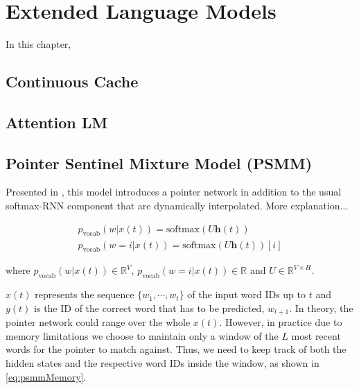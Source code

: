 \chapter{Extended Language Models}

In this chapter, 


\section{Continuous Cache}
\label{sec:continuousCache}

\cite{grave2016improving}

\section{Attention LM}
\label{sec:attention}

\cite{daniluk2017frustratingly}

\section{Pointer Sentinel Mixture Model (PSMM)}
\label{sec:pointerMixture}

Presented in \cite{merity2016pointer}, this model introduces a pointer network in addition to the usual softmax-RNN component that are dynamically interpolated. More explanation...

\begin{equation} \label{eq:psmmMemory}
	\begin{gathered}
		p_{\text{vocab}}(w|x(t)) = \text{softmax}(U\mathbf{h}(t))  \\
		p_{\text{vocab}}(w=i|x(t)) = \text{softmax}(U\mathbf{h}(t))[i] 
	\end{gathered}	
\end{equation}

where $p_{\text{vocab}}(w|x(t)) \in \mathbb{R}^{V}$, $p_{\text{vocab}}(w=i|x(t)) \in \mathbb{R}$ and $U \in \mathbb{R}^{V \times H}$.

$x(t)$ represents the sequence $\{w_1, \cdots , w_t\}$ of the input word IDs up to $t$  and $y(t)$ is the ID of the correct word that has to be predicted, $w_{t+1}$. In theory, the pointer network could range over the whole $x(t)$. However, in practice due to memory limitations we choose to maintain only a window of the $L$ most recent words for the pointer to match against. Thus, we need to keep track of both the hidden states and the respective word IDs inside the window, as shown in \autoref{eq:psmmMemory}.

